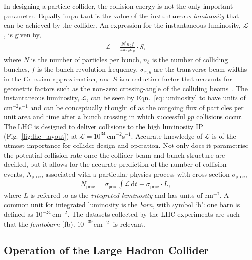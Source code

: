 In designing a particle collider, the collision energy is not the only important parameter.
Equally important is the value of the instantaneous \textit{luminosity}
that can be achieved by the collider.
An expression for the instantaneous luminosity, $\mathcal{L}$, is given by,
\begin{align}
    \mathcal{L} = \frac{N^2 n_b f}{4 \pi \sigma_x \sigma_y} \cdot S,
    \label{eq:luminosity}
\end{align}
where $N$ is the number of particles per bunch, $n_b$ is the number of colliding bunches,
$f$ is the bunch revolution frequency, $\sigma_{x,y}$ are the transverse beam widths in the
Gaussian approximation, and $S$ is a reduction factor that accounts for geometric factors
such as the non-zero crossing-angle of the colliding beams~\cite{LHCDesignIII,LumiConcept}.
The instantaneous luminosity, $\mathcal{L}$, can be seen by Eqn.~\ref{eq:luminosity}
to have units of cm$^{-2}$s$^{-1}$ and can be conceptually thought of as the
outgoing flux of particles per unit area and time after a bunch crossing in which successful $pp$
collisions occur.
The LHC is designed to deliver collisions to the high luminosity IP (Fig.~\ref{fig:lhc_layout})
at $\mathcal{L} = 10^{34}$\,cm$^{-2}$s$^{-1}$.
Accurate knowledge of $\mathcal{L}$ is of the utmost importance for collider design and operation.
Not only does it parametrise the potential collision rate once the collider beam and bunch
structure are decided, but it allows for the accurate prediction of the number
of collision events, $N_{\text{proc}}$, associated with a particular physics process
with cross-section $\sigma_{\text{proc}}$,
\begin{align}
    N_{\text{proc}} = \sigma_{\text{proc}} \int \mathcal{L}\, \mathrm{d}t \equiv \sigma_{\text{proc}} \cdot L,
    \label{eq:n_exp_lumi}
\end{align}
where $L$ is referred to as the \textit{integrated luminosity} and has units of cm$^{-2}$.
A common unit for integrated luminosity is the \textit{barn}, with symbol `b': one barn is defined as $10^{-24}$\,cm$^{-2}$.
The datasets collected by the LHC experiments are such that the \textit{femtobarn} (fb), $10^{-39}$\,cm$^{-2}$, is relevant.

\subsection{Operation of the Large Hadron Collider}
\label{sec:lhc_operation}

